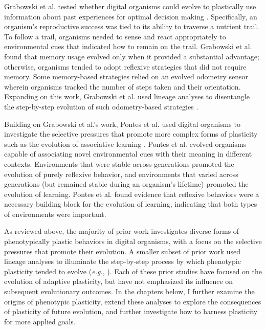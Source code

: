 Grabowski et al. tested whether digital organisms could evolve to plastically use information about past experiences for optimal decision making \citep{grabowski2010early}. 
Specifically, an organism's reproductive success was tied to its ability to traverse a nutrient trail.
To follow a trail, organisms needed to sense and react appropriately to environmental cues that indicated how to remain on the trail.
Grabowski et al. found that memory usage evolved only when it provided a substantial advantage; otherwise, organisms tended to adopt reflexive strategies that did not require memory.
Some memory-based strategies relied on an evolved odometry sensor wherein organisms tracked the number of steps taken and their orientation.
Expanding on this work, Grabowski et al. used lineage analyses to disentangle the step-by-step evolution of such odometry-based strategies \citep{grabowski_case_2013}. 

Building on Grabowski et al.'s work, Pontes et al. used digital organisms to investigate the selective pressures that promote more complex forms of plasticity such as the evolution of associative learning \citep{pontes_investigations_2017,pontes_evolutionary_2020}.
Pontes et al. evolved organisms capable of associating novel environmental cues with their meaning in different contexts.
Environments that were stable across generations promoted the evolution of purely reflexive behavior, and environments that varied across generations (but remained stable during an organism's lifetime) promoted the evolution of learning.
Pontes et al. found evidence that reflexive behaviors were a necessary building block for the evolution of learning, indicating that both types of environments were important.  


As reviewed above, the majority of prior work investigates diverse forms of phenotypically plastic behaviors in digital organisms, with a focus on the selective pressures that promote their evolution.
A smaller subset of prior work used lineage analyses to illuminate the step-by-step process by which phenotypic plasticity tended to evolve (\textit{e.g.}, \citealt{grabowski_case_2013,goldsby_evolutionary_2014,pontes_evolutionary_2020}). 
Each of these prior studies have focused on the evolution of adaptive plasticity, but have not emphasized its influence on subsequent evolutionary outcomes.
In the chapters below, I further examine the origins of phenotypic plasticity, extend these analyses to explore the consequences of plasticity of future evolution, and further investigate how to harness plasticity for more applied goals.

